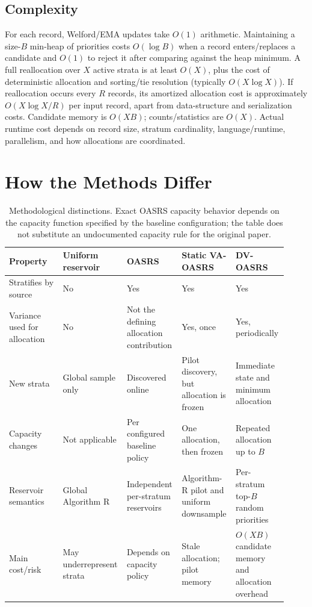 \documentclass[11pt]{article}
\begin{document}
\subsection{Complexity}

For each record, Welford/EMA updates take $O(1)$ arithmetic. Maintaining a size-$B$ min-heap of priorities costs $O(\log B)$ when a record enters/replaces a candidate and $O(1)$ to reject it after comparing against the heap minimum. A full reallocation over $X$ active strata is at least $O(X)$, plus the cost of deterministic allocation and sorting/tie resolution (typically $O(X\log X)$). If reallocation occurs every $R$ records, its amortized allocation cost is approximately $O(X\log X/R)$ per input record, apart from data-structure and serialization costs. Candidate memory is $O(XB)$; counts/statistics are $O(X)$. Actual runtime cost depends on record size, stratum cardinality, language/runtime, parallelism, and how allocations are coordinated.

\section{How the Methods Differ}

\begin{table}[ht]
\centering
\small
\begin{tabular}{p{0.19\linewidth}p{0.19\linewidth}p{0.18\linewidth}p{0.18\linewidth}p{0.18\linewidth}}
\toprule
Property & Uniform reservoir & OASRS & Static VA-OASRS & DV-OASRS\\
\midrule
Stratifies by source & No & Yes & Yes & Yes\\
Variance used for allocation & No & Not the defining allocation contribution & Yes, once & Yes, periodically\\
New strata & Global sample only & Discovered online & Pilot discovery, but allocation is frozen & Immediate state and minimum allocation\\
Capacity changes & Not applicable & Per configured baseline policy & One allocation, then frozen & Repeated allocation up to $B$\\
Reservoir semantics & Global Algorithm R & Independent per-stratum reservoirs & Algorithm-R pilot and uniform downsample & Per-stratum top-$B$ random priorities\\
Main cost/risk & May underrepresent strata & Depends on capacity policy & Stale allocation; pilot memory & $O(XB)$ candidate memory and allocation overhead\\
\bottomrule
\end{tabular}
\caption{Methodological distinctions. Exact OASRS capacity behavior depends on the capacity function specified by the baseline configuration; the table does not substitute an undocumented capacity rule for the original paper.}
\label{tab:methods}
\end{table}
\end{document}
